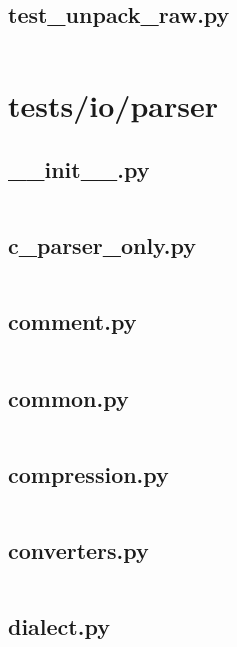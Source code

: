 \documentclass{article}
\begin{document}
\subsection{test\_unpack\_raw.py}
\inputminted{python}{/home/dufferzafar/dev/@clones/pandas/pandas/tests/io/msgpack/test_unpack_raw.py}
\newpage

\section{tests/io/parser}

\subsection{\_\_init\_\_.py}
\inputminted{python}{/home/dufferzafar/dev/@clones/pandas/pandas/tests/io/parser/__init__.py}
\newpage

\subsection{c\_parser\_only.py}
\inputminted{python}{/home/dufferzafar/dev/@clones/pandas/pandas/tests/io/parser/c_parser_only.py}
\newpage

\subsection{comment.py}
\inputminted{python}{/home/dufferzafar/dev/@clones/pandas/pandas/tests/io/parser/comment.py}
\newpage

\subsection{common.py}
\inputminted{python}{/home/dufferzafar/dev/@clones/pandas/pandas/tests/io/parser/common.py}
\newpage

\subsection{compression.py}
\inputminted{python}{/home/dufferzafar/dev/@clones/pandas/pandas/tests/io/parser/compression.py}
\newpage

\subsection{converters.py}
\inputminted{python}{/home/dufferzafar/dev/@clones/pandas/pandas/tests/io/parser/converters.py}
\newpage

\subsection{dialect.py}
\inputminted{python}{/home/dufferzafar/dev/@clones/pandas/pandas/tests/io/parser/dialect.py}
\newpage
\end{document}
